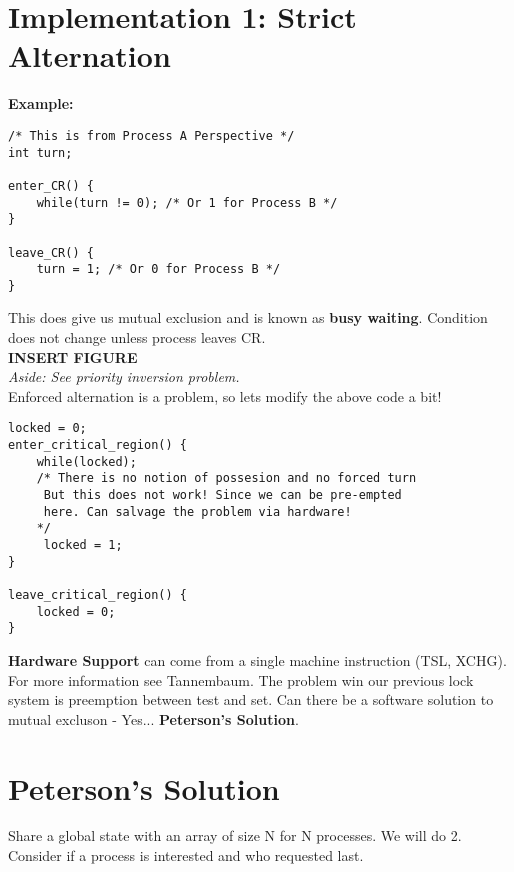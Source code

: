 \documentclass[../base_file/cs1550_notes.tex]{subfiles}
\begin{document}
\section{Implementation 1: Strict Alternation}
\textbf{Example:}\\
\lstset{language=C}
\begin{lstlisting}
/* This is from Process A Perspective */
int turn;

enter_CR() {
	while(turn != 0); /* Or 1 for Process B */
}

leave_CR() {
	turn = 1; /* Or 0 for Process B */
}
\end{lstlisting}

This does give us mutual exclusion and is known as \textbf{busy waiting}.  Condition does
not change unless process leaves CR.\\

\textbf{INSERT FIGURE}\\

\textit{Aside: See priority inversion problem.}\\

Enforced alternation is a problem, so lets modify the above code a bit!\\

\begin{lstlisting}
locked = 0;
enter_critical_region() {
	while(locked);
	/* There is no notion of possesion and no forced turn 
	 But this does not work! Since we can be pre-empted 
	 here. Can salvage the problem via hardware!  	
	*/	
	 locked = 1;
}

leave_critical_region() {
	locked = 0;
}
\end{lstlisting}

\textbf{Hardware Support} can come from a single machine instruction (TSL, XCHG). For
more information see Tannembaum.  The problem win our previous lock system is preemption
between test and set.  Can there be a software solution to mutual excluson - Yes...
\textbf{Peterson's Solution}.
\newpage
\section{Peterson's Solution}
Share a global state with an array of size N for N processes. We will do 2. Consider
if a process is interested and who requested last.
\end{document}
